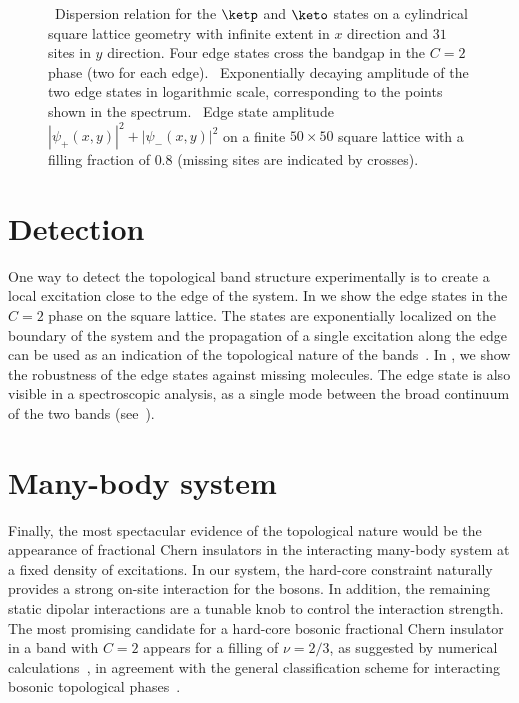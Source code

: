 \begin{figure}[t]
    \centering
    \begin{minipage}[b]{.415\columnwidth}
    \end{minipage}

    \caption{
        \sfA~Dispersion relation for the $\ketp$ and $\keto$ states on a cylindrical square lattice geometry with infinite extent in $x$ direction and $31$ sites in $y$ direction.
        Four edge states cross the bandgap in the $C=2$ phase (two for each edge).
        \sfB~Exponentially decaying amplitude of the two edge states in logarithmic scale, corresponding to the points shown in the spectrum.
        \sfC~Edge state amplitude $|\psi_+(x,y)|^2 + |\psi_-(x,y)|^2$ on a finite $50 \times 50$ square lattice with a filling fraction of $0.8$ (missing sites are indicated by crosses).
    }
\end{figure}

\section{Detection}
One way to detect the topological band structure experimentally is to create a local excitation close to the edge of the system.
In  we show the edge states in the $C=2$ phase on the square lattice.
The states are exponentially localized on the boundary of the system and the propagation of a single excitation along the edge can be used as an indication of the topological nature of the bands~\cite{Hafezi2013}.
In , we show the robustness of the edge states against missing molecules.
The edge state is also visible in a spectroscopic analysis, as a single mode between the broad continuum of the two bands (see~).

\section{Many-body system}
Finally, the most spectacular evidence of the topological nature would be the appearance of fractional Chern insulators in the interacting many-body system at a fixed density of excitations.
In our system, the hard-core constraint naturally provides a strong on-site interaction for the bosons.
In addition, the remaining static dipolar interactions are a tunable knob to control the interaction strength.
The most promising candidate for a hard-core bosonic fractional Chern insulator in a band with $C=2$ appears for a filling of $\nu = 2/3$, as suggested by numerical calculations~\cite{Moller2009,Wang2012a}, in agreement with the general classification scheme for interacting bosonic topological phases~\cite{Lu2012a,Chen2013}.


